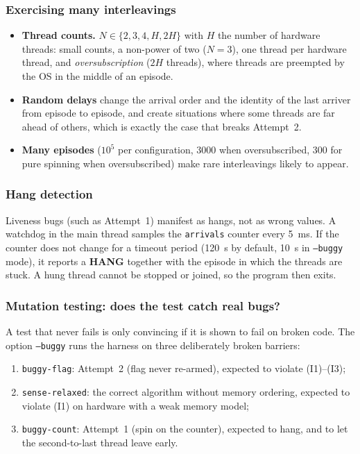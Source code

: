 \subsubsection{Exercising many interleavings}

\begin{itemize}
    \item \textbf{Thread counts.} $N \in \{2, 3, 4, H, 2H\}$ with $H$ the
          number of hardware threads: small counts, a non-power of two
          ($N=3$), one thread per hardware thread, and
          \emph{oversubscription} ($2H$ threads), where threads are
          preempted by the OS in the middle of an episode.
    \item \textbf{Random delays} change the arrival order and the identity
          of the last arriver from episode to episode, and create situations
          where some threads are far ahead of others, which is exactly the
          case that breaks Attempt~2.
    \item \textbf{Many episodes} ($10^5$ per configuration, $3000$ when
          oversubscribed, $300$ for pure spinning when oversubscribed)
          make rare interleavings likely to appear.
\end{itemize}

\subsubsection{Hang detection}

Liveness bugs (such as Attempt~1) manifest as hangs, not as wrong values. A
watchdog in the main thread samples the \texttt{arrivals} counter every
\SI{5}{\milli\second}. If the counter does not change for a timeout period
(\SI{120}{\second} by default, \SI{10}{\second} in \texttt{--buggy} mode),
it reports a \textbf{HANG} together with the episode in which the threads
are stuck. A hung thread cannot be stopped or joined, so the program then
exits.

\subsubsection{Mutation testing: does the test catch real bugs?}
\label{sec:ex2-mutation}

A test that never fails is only convincing if it is shown to fail on broken
code. The option \texttt{--buggy} runs the harness on three deliberately
broken barriers:

\begin{enumerate}
    \item \texttt{buggy-flag}: Attempt~2 (flag never re-armed), expected to
          violate (I1)--(I3);
    \item \texttt{sense-relaxed}: the correct algorithm without memory
          ordering, expected to violate (I1) on hardware with a weak memory
          model;
    \item \texttt{buggy-count}: Attempt~1 (spin on the counter), expected to
          hang, and to let the second-to-last thread leave early.
\end{enumerate}

